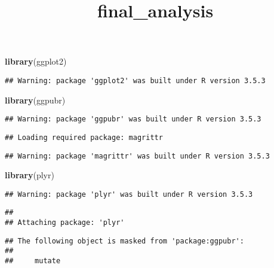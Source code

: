 \documentclass[]{article}
\title{final\_analysis}
\author{}
\date{}
\newenvironment{Shaded}{\begin{snugshade}}{\end{snugshade}}
\newcommand{\KeywordTok}[1]{\textcolor[rgb]{0.13,0.29,0.53}{\textbf{#1}}}
\newcommand{\NormalTok}[1]{#1}
\begin{document}
\maketitle

\begin{Shaded}
\begin{Highlighting}[]
\KeywordTok{library}\NormalTok{(ggplot2)}
\end{Highlighting}
\end{Shaded}

\begin{verbatim}
## Warning: package 'ggplot2' was built under R version 3.5.3
\end{verbatim}

\begin{Shaded}
\begin{Highlighting}[]
\KeywordTok{library}\NormalTok{(ggpubr)}
\end{Highlighting}
\end{Shaded}

\begin{verbatim}
## Warning: package 'ggpubr' was built under R version 3.5.3
\end{verbatim}

\begin{verbatim}
## Loading required package: magrittr
\end{verbatim}

\begin{verbatim}
## Warning: package 'magrittr' was built under R version 3.5.3
\end{verbatim}

\begin{Shaded}
\begin{Highlighting}[]
\KeywordTok{library}\NormalTok{(plyr)}
\end{Highlighting}
\end{Shaded}

\begin{verbatim}
## Warning: package 'plyr' was built under R version 3.5.3
\end{verbatim}

\begin{verbatim}
## 
## Attaching package: 'plyr'
\end{verbatim}

\begin{verbatim}
## The following object is masked from 'package:ggpubr':
## 
##     mutate
\end{verbatim}
\end{document}
